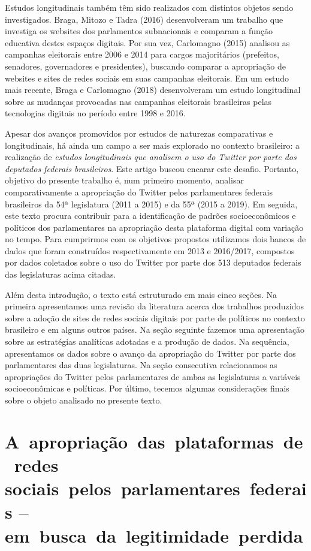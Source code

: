 Estudos longitudinais também têm sido realizados com distintos objetos
sendo investigados. Braga, Mitozo e Tadra (2016) desenvolveram um
trabalho que investiga os websites dos parlamentos subnacionais e
comparam a função educativa destes espaços digitais. Por sua vez,
Carlomagno (2015) analisou as campanhas eleitorais entre 2006 e 2014
para cargos majoritários (prefeitos, senadores, governadores e
presidentes), buscando comparar a apropriação de websites e sites de
redes sociais em suas campanhas eleitorais. Em um estudo mais recente,
Braga e Carlomagno (2018) desenvolveram um estudo longitudinal sobre as
mudanças provocadas nas campanhas eleitorais brasileiras pelas
tecnologias digitais no período entre 1998 e 2016.

Apesar dos avanços promovidos por estudos de naturezas comparativas e
longitudinais, há ainda um campo a ser mais explorado no contexto
brasileiro: a realização de \emph{estudos longitudinais} \emph{que
analisem o uso do Twitter por parte dos deputados federais brasileiros}.
Este artigo buscou encarar este desafio. Portanto, objetivo do presente
trabalho é, num primeiro momento, analisar comparativamente a
apropriação do Twitter pelos parlamentares federais brasileiros da 54ª
legislatura (2011 a 2015) e da 55ª (2015 a 2019). Em seguida, este texto
procura contribuir para a identificação de padrões socioeconômicos e
políticos dos parlamentares na apropriação desta plataforma digital com
variação no tempo. Para cumprirmos com os objetivos propostos utilizamos
dois bancos de dados que foram construídos respectivamente em 2013 e
2016/2017, compostos por dados coletados sobre o uso do Twitter por
parte dos 513 deputados federais das legislaturas acima citadas.

Além desta introdução, o texto está estruturado em mais cinco seções. Na
primeira apresentamos uma revisão da literatura acerca dos trabalhos
produzidos sobre a adoção de sites de redes sociais digitais por parte
de políticos no contexto brasileiro e em alguns outros países. Na seção
seguinte fazemos uma apresentação sobre as estratégias analíticas
adotadas e a produção de dados. Na sequência, apresentamos os dados
sobre o avanço da apropriação do Twitter por parte dos parlamentares das
duas legislaturas. Na seção consecutiva relacionamos as apropriações do
Twitter pelos parlamentares de ambas as legislaturas a variáveis
socioeconômicas e políticas. Por último, tecemos algumas considerações
finais sobre o objeto analisado no presente texto.

\section{A~apropriação~das~plataformas~de~redes sociais~pelos~parlamentares~federais -- em~busca~da~legitimidade~perdida}

